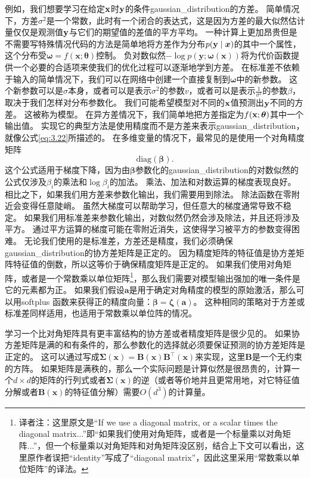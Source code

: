 例如，我们想要学习在给定$\mathbf{x}$时$\mathbf{y}$的条件\gls{gaussian_distribution}的方差。
简单情况下，方差$\sigma^2$是一个常数，此时有一个闭合的表达式，这是因为方差的最大似然估计量仅仅是观测值$\mathbf{y}$与它们的期望值的差值的平方平均。
一种计算上更加昂贵但是不需要写特殊情况代码的方法是简单地将方差作为分布$p(\mathbf{y}\mid\bm{x})$的其中一个属性，这个分布受$\bm{\omega}=f(\bm{x};\bm{\theta})$控制。
负对数似然$-\log p(\bm{y};\bm{\omega}(\bm{x}))$将为代价函数提供一个必要的合适项来使我们的优化过程可以逐渐地学到方差。
在标准差不依赖于输入的简单情况下，我们可以在网络中创建一个直接复制到$\bm{\omega}$中的新参数。
这个新参数可以是$\sigma$本身，或者可以是表示$\sigma^2$的参数$v$，或者可以是表示$\frac{1}{\sigma^2}$的参数$\beta$，取决于我们怎样对分布参数化。
我们可能希望模型对不同的$\mathbf{x}$值预测出$\mathbf{y}$不同的方差。
这被称为模型。
在异方差情况下，我们简单地把方差指定为$f(\mathbf{x};\bm{\theta})$其中一个输出值。
实现它的典型方法是使用精度而不是方差来表示\gls{gaussian_distribution}，就像公式\ref{eq:3.22}所描述的。
在多维变量的情况下，最常见的是使用一个对角精度矩阵
\begin{equation}
\text{diag}(\bm{\beta}).
\end{equation}
这个公式适用于梯度下降，因为由$\bm{\beta}$参数化的\gls{gaussian_distribution}的对数似然的公式仅涉及$\beta_i$的乘法和$\log \beta_i$的加法。
乘法、加法和对数运算的梯度表现良好。
相比之下，如果我们用方差来参数化输出，我们需要用到除法。
除法函数在零附近会变得任意陡峭。
虽然大梯度可以帮助学习，但任意大的梯度通常导致不稳定。
如果我们用标准差来参数化输出，对数似然仍然会涉及除法，并且还将涉及平方。
通过平方运算的梯度可能在零附近消失，这使得学习被平方的参数变得困难。
无论我们使用的是标准差，方差还是精度，我们必须确保\gls{gaussian_distribution}的协方差矩阵是正定的。
因为精度矩阵的特征值是协方差矩阵特征值的倒数，所以这等价于确保精度矩阵是正定的。
如果我们使用对角矩阵，或者是一个常数乘以单位矩阵\footnote{译者注：这里原文是``If we use a diagonal matrix, or a scalar times the diagonal matrix...''即``如果我们使用对角矩阵，或者是一个标量乘以对角矩阵...''，但一个标量乘以对角矩阵和对角矩阵没区别，结合上下文可以看出，这里原作者误把``identity''写成了``diagonal matrix''，因此这里采用``常数乘以单位矩阵''的译法。}，那么我们需要对模型输出强加的唯一条件是它的元素都为正。
如果我们假设$\bm{a}$是用于确定对角精度的模型的原始激活，那么可以用softplus 函数来获得正的精度向量：$\bm{\beta}=\bm{\zeta}(\bm{a})$。
这种相同的策略对于方差或标准差同样适用，也适用于常数乘以单位阵的情况。


学习一个比对角矩阵具有更丰富结构的协方差或者精度矩阵是很少见的。
如果协方差矩阵是满的和有条件的，那么参数化的选择就必须要保证预测的协方差矩阵是正定的。
这可以通过写成$\bm{\Sigma}(\bm{x})=\bm{B}(\bm{x})\bm{B}^\top (\bm{x})$来实现，这里$\bm{B}$是一个无约束的方阵。
如果矩阵是满秩的，那么一个实际问题是计算似然是很昂贵的，计算一个$d\times d$的矩阵的行列式或者$\bm{\Sigma}(\bm{x})$的逆（或者等价地并且更常用地，对它特征值分解或者$\bm{B}(\bm{x})$的特征值分解）需要$O(d^3)$的计算量。

